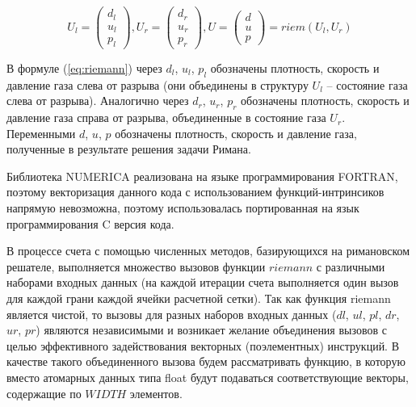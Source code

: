 \documentclass[
11pt,%
tightenlines,%
twoside,%
onecolumn,%
nofloats,%
nobibnotes,%
nofootinbib,%
superscriptaddress,%
noshowpacs,%
centertags]%
{revtex4}
\begin{document}
\begin{equation}\label{eq:riemann}
U_l = \left( \begin{array}{ccc} d_l \\ u_l \\ p_l \end{array} \right),
U_r = \left( \begin{array}{ccc} d_r \\ u_r \\ p_r \end{array} \right),
U = \left( \begin{array}{ccc} d \\ u \\ p \end{array} \right) = riem(U_l, U_r)
\end{equation}

В формуле (\ref{eq:riemann}) через $d_l$, $u_l$, $p_l$ обозначены плотность, скорость и давление газа слева от разрыва (они объединены в структуру  $U_l$ -- состояние газа слева от разрыва).
Аналогично через $d_r$, $u_r$, $p_r$ обозначены плотность, скорость и давление газа справа от разрыва, объединенные в состояние газа $U_r$.
Переменными $d$, $u$, $p$ обозначены плотность, скорость и давление газа, полученные в результате решения задачи Римана.

Библиотека NUMERICA реализована на языке программирования FORTRAN, поэтому векторизация данного кода с использованием функций-интринсиков напрямую невозможна, поэтому использовалась портированная на язык программирования C версия кода.

В процессе счета с помощью численных методов, базирующихся на римановском решателе, выполняется множество вызовов функции $riemann$ с различными наборами входных данных (на каждой итерации счета выполняется один вызов для каждой грани каждой ячейки расчетной сетки).
Так как функция riemann является чистой, то вызовы для разных наборов входных данных ($dl$, $ul$, $pl$, $dr$, $ur$, $pr$) являются независимыми и возникает желание объединения вызовов с целью эффективного задействования векторных (поэлементных) инструкций.
В качестве такого объединенного вызова будем рассматривать функцию, в которую вместо атомарных данных типа float будут подаваться соответствующие векторы, содержащие по $WIDTH$ элементов.
\end{document}
